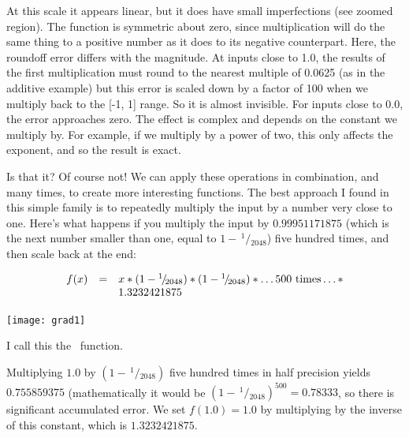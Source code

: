 \documentclass[twocolumn]{article}
\newcommand\sfrac[2]{\!{}\,^{#1}\!/{}\!_{#2}}
\begin{document}
At this scale it appears linear, but it does have small imperfections
(see zoomed region). The function is symmetric about zero, since
multiplication will do the same thing to a positive number as it does
to its negative counterpart. Here, the roundoff error differs with the
magnitude. At inputs close to 1.0, the results of the first
multiplication must round to the nearest multiple of 0.0625 (as in the
additive example) but this error is scaled down by a factor of 100
when we multiply back to the [-1, 1] range. So it is almost invisible.
For inputs close to 0.0, the error approaches zero. The effect is complex
and depends on the constant we multiply by. For example, if we multiply
by a power of two, this only affects the exponent, and so the result is
exact.

\medskip
Is that it? Of course not! We can apply these operations in
combination, and many times, to create more interesting functions. The
best approach I found in this simple family is to repeatedly multiply
the input by a number very close to one. Here's what happens if you
multiply the input by $0.99951171875$ (which is the next number
smaller than one, equal to $1 - \sfrac{1}{2048}$) five hundred times,
and then scale back at the end:

\[
\begin{array}{rcl}
  f(x) & = & x * (1 - \sfrac{1}{2048}) * (1 - \sfrac{1}{2048}) * \ldots \textrm{500 times} \ldots * \\
  \, & \, & 1.3232421875$$
\end{array}
\]

\begin{center}
\texttt{[image: grad1]}
\end{center}

I call this the \gradone\ function.

Multiplying $1.0$ by $(1 - \sfrac{1}{2048})$ five hundred times in
half precision yields $0.755859375$ (mathematically it would be $(1 -
\sfrac{1}{2048})^{500} = 0.78333$, so there is significant accumulated
error. We set $f(1.0) = 1.0$ by multiplying by the inverse of this
constant, which is $1.3232421875$.
\end{document}
